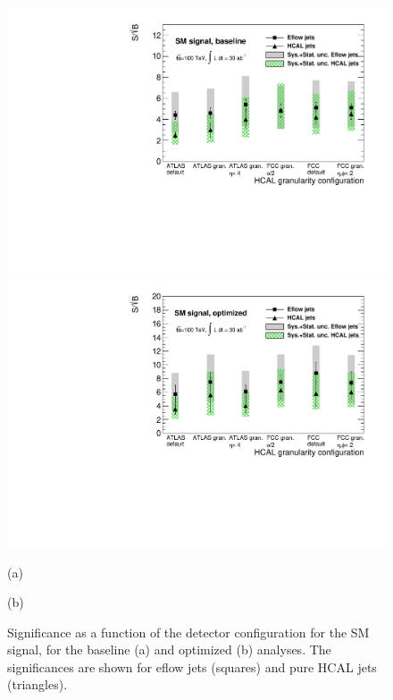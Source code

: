 \begin{figure}
	\centering
	\begin{minipage}{.5\textwidth}
		\centering
		\includegraphics[trim={.6cm 0 0 0},clip,width=\linewidth]{./Figures/SSBvsGran_SM.pdf}
	\end{minipage}%
	\begin{minipage}{.5\textwidth}
		\centering
		\includegraphics[trim={0 0 .6cm 0},clip,width=\linewidth]{./Figures/SSBvsGran_SM_Opt.pdf}
	\end{minipage}
	\begin{minipage}[t]{0.5\textwidth}
		\caption*{(a)}
	\end{minipage}%
	\hfill
	\begin{minipage}[t]{0.5\textwidth}
		\caption*{(b)}
	\end{minipage}
	\caption{Significance as a function of the detector configuration for the SM signal, for the baseline (a) and optimized (b) analyses. The significances are shown for eflow jets (squares) and pure HCAL jets (triangles).}
	\label{fig:SSBvsGran1}
\end{figure}

